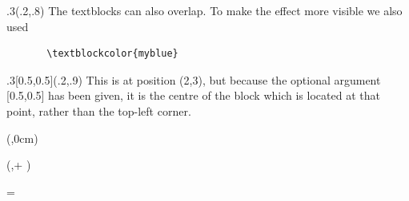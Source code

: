    \begin{textblock}{.3}(.2,.8)
     The textblocks can also overlap.
     To make the effect more visible we also used 
     \begin{verbatim}
       \textblockcolor{myblue}
     \end{verbatim}
	 \end{textblock}
   
   \begin{textblock}{.3}[0.5,0.5](.2,.9)
		This is at position (2,3), but because the optional argument
		[0.5,0.5]
		has been given, it is the centre of the block which is
		located at that point, rather than the top-left corner.
	\end{textblock}
  \newenvironment{mybox}[3]{
	  \begin{textblock*}{#1}#2
  	  \begin{minipage}[t][#3][t]{\textwidth}	
  }
  {
	    \end{minipage}
	  \end{textblock*}
  }
  \newlength{\vblocksep}
  \setlength{\vblocksep}{1cm} 
  \newlength{\hblocksep}
  \setlength{\hblocksep}{1cm} 
  \newlength{\xcols}
  \setlength{\xcols}{0.4\textwidth} 
  \newlength{\hcols}
  \setlength{\hcols}{80cm} %
  \newlength{\wcols}
  \setlength{\wcols}{40cm} %
  \newlength{\wcolA}
  \setlength{\wcolA}{.41\wcols} 
  \newlength{\hboxOneA} 
  \setlength{\hboxOneA}{15cm}
  \newlength{\hboxTwoA}
  \setlength{\hboxTwoA}{ \dimexpr ( \hcols - \hboxOneA) \relax}
  
  \begin{mybox}{\wcolA}{(\xcols,0cm)}{\hboxOneA}
      
  \end{mybox}
  \begin{mybox}{\wcolA}{(\xcols,\dimexpr \hboxOneA + \vblocksep \relax )}{\hboxTwoA}
    
  \end{mybox}

  
  \newlength{\wcolB}
  \setlength{\wcolB}{\dimexpr \wcols-\wcolA \relax} 
  \newlength{\hboxOneB}
  =\vtop{%
  	\begin{minipage}[t]{\wcolB}	
      
	  \end{minipage}
  }
  \setlength{\hboxOneB}{\ht0}%
  \addtolength{\hboxOneB}{\dp0}%
  \newlength{\hboxTwoB}
  \setlength{\hboxTwoB}{ \dimexpr ( \hcols - \hboxOneB) \relax}
  
